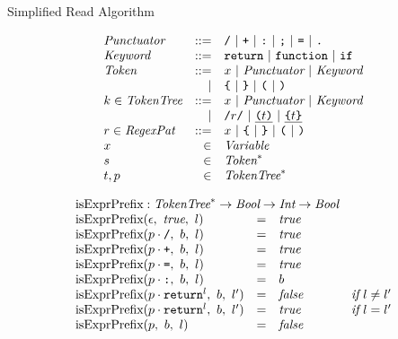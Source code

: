\documentclass[9pt]{sigplanconf}
\begin{document}
\begin{displayfigure*}{\label{fig:simpleread}Simplified Read Algorithm}
\begin{minipage}[t]{0.5\linewidth}
\[
\begin{array}{lrl}
  \textit{Punctuator} &::=& \texttt{/} ~|~ \texttt{+} ~|~ \texttt{:} ~|~
  \texttt{;} ~|~ \texttt{=} ~|~ \texttt{.}
  \\
  \textit{Keyword} &::=& \texttt{return} ~|~ \texttt{function}~|~
  \texttt{if}
  \\


   \textit{Token} &::=& x ~|~ \textit{Punctuator} ~|~ \textit{Keyword}
  \\
  &|& 
  \texttt{\{} ~|~ 
  \texttt {\}} ~|~  
  \texttt{(} ~|~ 
  \texttt{)}
  \\
  k \in \textit{TokenTree} &::=& x ~|~ \textit{Punctuator} ~|~ \textit{Keyword}
  \\
  &|& \texttt{/}r\texttt{/} ~|~ \underline{ \texttt{(} t \texttt{)}} ~|~ \underline{ \texttt{\{} t \texttt{\}} }
  \\
  r \in \textit{RegexPat} &::=& x ~|~ \texttt{\{} ~|~ \texttt{\}}
  ~|~ \texttt{(} ~|~ \texttt{)}
  \\
  x &\in& \textit{Variable}
  \\
  s &\in& \textit{Token}^{*}
  \\
  t,p &\in& \textit{TokenTree}^{*}
\end{array}
\]
\end{minipage}
\begin{minipage}[t]{0.5\linewidth}
\[
  \begin{array}{lcll}
    \multicolumn{3}{l}{\textrm{isExprPrefix} : \TT^{*} \rightarrow
      \textit{Bool} \rightarrow \textit{Int} \rightarrow \textit{Bool}}
    \\
    \isobject(\epsilon,~\textit{true},~l) &=& \textit{true}
    \\
    \isobject(p \cdot \div,~b,~l) &=& \textit{true}
    \\
    \isobject(p \cdot \texttt{+},~b,~l) &=& \textit{true}
    \\
    \isobject(p \cdot \texttt{=},~b,~l) &=& \textit{true}
    \\
    \isobject(p \cdot \texttt{:},~b,~l) &=& b
    \\
    \isobject(p \cdot \texttt{return}^{l},~b,~l') &=& \textit{false} 
    & \textit{if}~l \not = l'
    \\
    \isobject(p \cdot \texttt{return}^{l},~b,~l') &=& \textit{true} 
    & \textit{if}~l = l'
    \\
    \isobject(p ,~b,~l) &=& \textit{false}
    \\

\end{array}\]
\end{minipage}
\end{displayfigure*}
\end{document}
